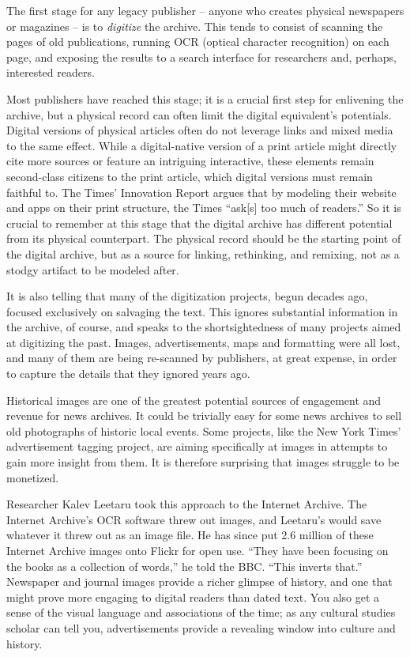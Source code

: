 The first stage for any legacy publisher -- anyone who creates physical newspapers or magazines -- is to \emph{digitize} the archive. This tends to consist of scanning the pages of old publications, running OCR (optical character recognition) on each page, and exposing the results to a search interface for researchers and, perhaps, interested readers.

Most publishers have reached this stage; it is a crucial first step for enlivening the archive, but a physical record can often limit the digital equivalent's potentials. Digital versions of physical articles often do not leverage links and mixed media to the same effect. While a digital-native version of a print article might directly cite more sources or feature an intriguing interactive, these elements remain second-class citizens to the print article, which digital versions must remain faithful to. The Times' Innovation Report argues that by modeling their website and apps on their print structure, the Times ``ask[s] too much of readers.'' So it is crucial to remember at this stage that the digital archive has different potential from its physical counterpart. The physical record should be the starting point of the digital archive, but as a source for linking, rethinking, and remixing, not as a stodgy artifact to be modeled after.


It is also telling that many of the digitization projects, begun decades ago, focused exclusively on salvaging the text. This ignores substantial information in the archive, of course, and speaks to the shortsightedness of many projects aimed at digitizing the past. Images, advertisements, maps and formatting were all lost, and many of them are being re-scanned by publishers, at great expense, in order to capture the details that they ignored years ago.

Historical images are one of the greatest potential sources of engagement and revenue for news archives. It could be trivially easy for some news archives to sell old photographs of historic local events. Some projects, like the New York Times' advertisement tagging project, are aiming specifically at images in attempts to gain more insight from them. It is therefore surprising that images struggle to be monetized. 

Researcher Kalev Leetaru took this approach to the Internet Archive. The Internet Archive's OCR software threw out images, and Leetaru's would save whatever it threw out as an image file. He has since put 2.6 million of these Internet Archive images onto Flickr for open use. ``They have been focusing on the books as a collection of words,'' he told the BBC. ``This inverts that.''\autocite{bbc_leetaru} Newspaper and journal images provide a richer glimpse of history, and one that might prove more engaging to digital readers than dated text. You also get a sense of the visual language and associations of the time; as any cultural studies scholar can tell you, advertisements provide a revealing window into culture and history.

